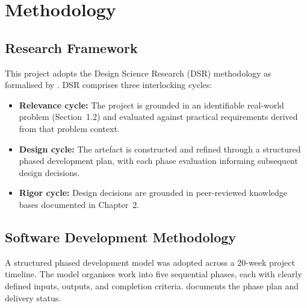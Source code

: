 \chapter{Methodology}
\label{chap:03}
\setlength{\parskip}{1em}

\section{Research Framework}

This project adopts the Design Science Research (DSR) methodology as
formalised by \citet{hevner2004}. DSR comprises three interlocking cycles:

\begin{itemize}
  \item \textbf{Relevance cycle:} The project is grounded in an
  identifiable real-world problem (Section~1.2) and evaluated against
  practical requirements derived from that problem context.
  \item \textbf{Design cycle:} The artefact is constructed and refined
  through a structured phased development plan, with each phase evaluation
  informing subsequent design decisions.
  \item \textbf{Rigor cycle:} Design decisions are grounded in
  peer-reviewed knowledge bases documented in Chapter~2.
\end{itemize}

\section{Software Development Methodology}

A structured phased development model was adopted across a 20-week
project timeline. The model organises work into five sequential phases,
each with clearly defined inputs, outputs, and completion criteria.
 documents the phase plan and delivery status.

